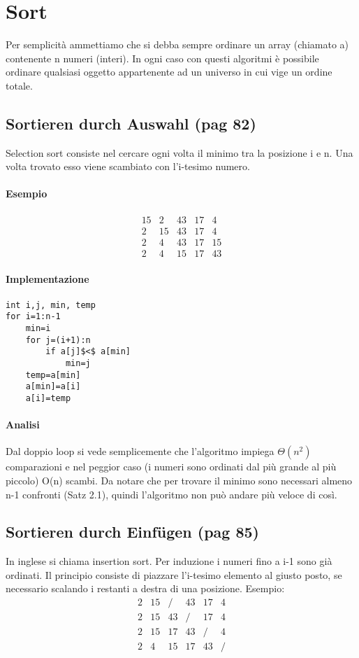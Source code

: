 \documentclass[a4paper]{book}
\begin{document}
\chapter{Sort}
Per semplicità ammettiamo che si debba sempre ordinare un array (chiamato a) contenente n numeri (interi). In ogni caso con questi algoritmi è possibile ordinare qualsiasi oggetto appartenente ad un universo in cui vige un ordine totale.
\section{Sortieren durch Auswahl (pag 82)}
Selection sort consiste nel cercare ogni volta il minimo tra la posizione i e n. Una volta trovato esso viene scambiato con l'i-tesimo numero. 
\subsubsection*{Esempio}
\[\begin{array}{*{20}{c}}
{15}&2&{43}&{17}&4\\
2&{15}&{43}&{17}&4\\
2&4&{43}&{17}&{15}\\
2&4&{15}&{17}&{43}
\end{array}\]
\subsubsection*{Implementazione}
\begin{lstlisting}
int i,j, min, temp
for i=1:n-1
	min=i
	for j=(i+1):n
		if a[j]$<$ a[min]
			min=j
	temp=a[min]
	a[min]=a[i]
	a[i]=temp
\end{lstlisting}
\subsubsection*{Analisi}

Dal doppio loop si vede semplicemente che l'algoritmo impiega $\Theta (n^2)$ comparazioni e nel peggior caso (i numeri sono ordinati dal più grande al più piccolo) O(n) scambi. Da notare che per trovare il minimo sono necessari almeno n-1 confronti (Satz 2.1), quindi l'algoritmo non può andare più veloce di così. 
\section{Sortieren durch Einfügen (pag 85)}
In inglese si chiama insertion sort. Per induzione i numeri fino a i-1 sono già ordinati. Il principio consiste di piazzare l'i-tesimo elemento al giusto posto, se necessario scalando i restanti a destra di una posizione. Esempio:
\[\begin{array}{*{20}{c}}
2&{15}&/&{43}&{17}&4\\
2&{15}&{43}&/&{17}&4\\
2&{15}&{17}&{43}&/&4\\
2&4&{15}&{17}&{43}&/
\end{array}\]
\end{document}
